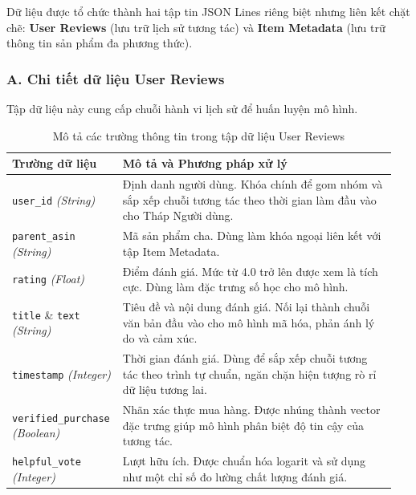 Dữ liệu được tổ chức thành hai tập tin JSON Lines riêng biệt nhưng liên kết chặt chẽ: \textbf{User Reviews} (lưu trữ lịch sử tương tác) và \textbf{Item Metadata} (lưu trữ thông tin sản phẩm đa phương thức).

\subsubsection*{A. Chi tiết dữ liệu User Reviews}
Tập dữ liệu này cung cấp chuỗi hành vi lịch sử để huấn luyện mô hình.

\begin{table}[H]
    \centering
    \caption{Mô tả các trường thông tin trong tập dữ liệu User Reviews}
    \label{tab:user_reviews_desc}
    \renewcommand{\arraystretch}{1.3}
    \begin{tabular}{|p{0.25\linewidth}|p{0.7\linewidth}|}
        \hline
        \textbf{Trường dữ liệu} & \textbf{Mô tả và Phương pháp xử lý} \\
        \hline
        \texttt{user\_id} \newline \textit{(String)} & 
        Định danh người dùng. Khóa chính để gom nhóm và sắp xếp chuỗi tương tác theo thời gian làm đầu vào cho Tháp Người dùng. \\
        \hline
        \texttt{parent\_asin} \newline \textit{(String)} & 
        Mã sản phẩm cha. Dùng làm khóa ngoại liên kết với tập Item Metadata. \\
        \hline
        \texttt{rating} \newline \textit{(Float)} & 
        Điểm đánh giá. Mức từ 4.0 trở lên được xem là tích cực. Dùng làm đặc trưng số học cho mô hình. \\
        \hline
        \texttt{title} \& \texttt{text} \newline \textit{(String)} & 
        Tiêu đề và nội dung đánh giá. Nối lại thành chuỗi văn bản đầu vào cho mô hình mã hóa, phản ánh lý do và cảm xúc. \\
        \hline
        \texttt{timestamp} \newline \textit{(Integer)} & 
        Thời gian đánh giá. Dùng để sắp xếp chuỗi tương tác theo trình tự chuẩn, ngăn chặn hiện tượng rò rỉ dữ liệu tương lai. \\
        \hline
        \texttt{verified\_purchase} \newline \textit{(Boolean)} & 
        Nhãn xác thực mua hàng. Được nhúng thành vector đặc trưng giúp mô hình phân biệt độ tin cậy của tương tác. \\
        \hline
        \texttt{helpful\_vote} \newline \textit{(Integer)} & 
        Lượt hữu ích. Được chuẩn hóa logarit và sử dụng như một chỉ số đo lường chất lượng đánh giá. \\
        \hline
    \end{tabular}
\end{table}

